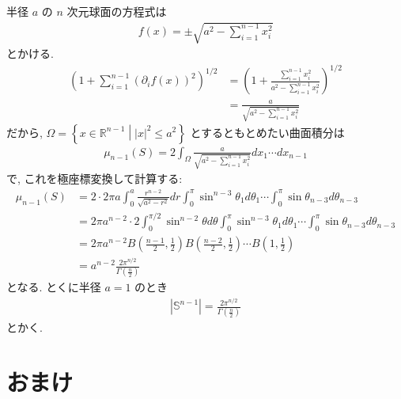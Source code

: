 \documentclass[openany, a4paper, oneside]{jsbook}
\theoremstyle{break}
\theoremstyle{breakdefn}
\newcommand{\abs}[1]{\left|#1\right|}
\newcommand{\rbk}[1]{\left (#1\right)}
\newcommand{\relmiddle}[1]{\mathrel{}\middle#1\mathrel{}}
\newcommand{\set}[2]{\left\{#1 \relmiddle| #2\right\}}
\newcommand{\bbR}{\mathbb{R}}
\begin{document}
半径 $a$ の $n$ 次元球面の方程式は
\begin{align}
 f(x)
 =
 \pm \sqrt{a^2 - \sum_{i=1}^{n-1} x_i^2}
\end{align}
とかける.
\begin{align}
 \rbk{1 + \sum_{i=1}^{n-1} \rbk{\partial_if(x)}^2}^{1/2}
 &=
 \rbk{1 + \frac{\sum_{i=1}^{n-1}x_i^2}{a^2 - \sum_{i=1}^{n-1} x_i^2}}^{1/2} \\
 &=
 \frac{a}{\sqrt{a^2 - \sum_{i=1}^{n-1} x_i^2}}
\end{align}
だから, $\Omega = \set{x \in \bbR^{n-1}}{\abs{x}^2 \le a^2}$ とするともとめたい曲面積分は
\begin{align}
 \mu_{n-1}(S)
 =
 2\int_{\Omega}
  \frac{a}{\sqrt{a^2 - \sum_{i=1}^{n-1} x_i^2}} dx_1 \cdots dx_{n-1}
\end{align}
で, これを極座標変換して計算する:
\begin{align}
 \mu_{n-1}(S)
 &=
 2 \cdot 2\pi a\int_0^a\frac{r^{n-2}}{\sqrt{a^2 - r^2}} dr
 \int_0^{\pi}\sin^{n-3}\theta_1d\theta_1
  \cdots \int_0^{\pi}\sin\theta_{n-3}d\theta_{n-3} \\
 &=
 2\pi a^{n-2} \cdot 2\int_0^{\pi/2} \sin^{n-2}\theta d\theta
  \int_0^{\pi}\sin^{n-3}\theta_1d\theta_1
  \cdots \int_0^{\pi}\sin\theta_{n-3}d\theta_{n-3} \\
 &=
 2\pi a^{n-2}
  B \rbk{\frac{n-1}{2}, \frac{1}{2}} B \rbk{\frac{n-2}{2}, \frac{1}{2}}
   \cdots B \rbk{1, \frac{1}{2}} \\
 &=
 a^{n-2} \frac{2\pi^{n/2}}{\Gamma \rbk{\frac{n}{2}}}
\end{align}
となる.
とくに半径 $a=1$ のとき
\begin{align}
 \abs{\mathbb{S}^{n-1}}
 =
 \frac{2\pi^{n/2}}{\Gamma \rbk{\frac{n}{2}}}
\end{align}
とかく.
\section{おまけ}
\end{document}
